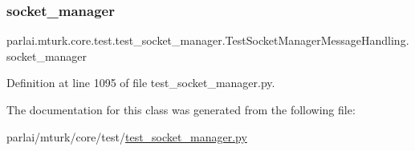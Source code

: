 \subsubsection{\texorpdfstring{socket\+\_\+manager}{socket\_manager}}
{\footnotesize\ttfamily parlai.\+mturk.\+core.\+test.\+test\+\_\+socket\+\_\+manager.\+Test\+Socket\+Manager\+Message\+Handling.\+socket\+\_\+manager}



Definition at line 1095 of file test\+\_\+socket\+\_\+manager.\+py.



The documentation for this class was generated from the following file\+:\begin{DoxyCompactItemize}
\item 
parlai/mturk/core/test/\hyperlink{test_2test__socket__manager_8py}{test\+\_\+socket\+\_\+manager.\+py}\end{DoxyCompactItemize}
